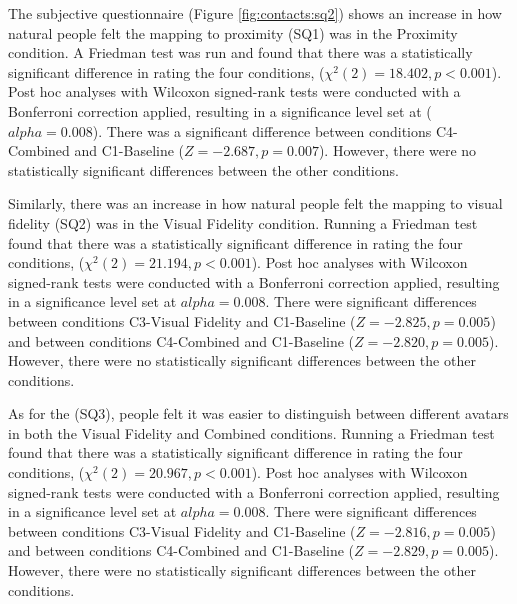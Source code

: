 The subjective questionnaire (Figure \ref{fig:contacts:sq2}) shows an increase in how natural people felt the mapping to proximity (SQ1) was in the Proximity condition. A Friedman test was run and found that there was a statistically significant difference in rating the four conditions, ($\chi^2(2)=18.402,p<0.001$). Post hoc analyses with Wilcoxon signed-rank tests were conducted with a Bonferroni correction applied, resulting in a significance level set at ($alpha=0.008$). There was a significant difference between conditions C4-Combined and C1-Baseline ($Z=-2.687, p=0.007$). However, there were no statistically significant differences between the other conditions.

Similarly, there was an increase in how natural people felt the mapping to visual fidelity (SQ2) was in the Visual Fidelity condition. Running a Friedman test found that there was a statistically significant difference in rating the four conditions, ($\chi^2(2)=21.194,p<0.001$). Post hoc analyses with Wilcoxon signed-rank tests were conducted with a Bonferroni correction applied, resulting in a significance level set at $alpha=0.008$. There were significant differences between conditions C3-Visual Fidelity and C1-Baseline ($Z=-2.825, p=0.005$) and between conditions C4-Combined and C1-Baseline ($Z=-2.820, p=0.005$). However, there were no statistically significant differences between the other conditions.

As for the (SQ3), people felt it was easier to distinguish between different avatars in both the Visual Fidelity and Combined conditions. Running a Friedman test found that there was a statistically significant difference in rating the four conditions, ($\chi^2(2)=20.967,p<0.001$). Post hoc analyses with Wilcoxon signed-rank tests were conducted with a Bonferroni correction applied, resulting in a significance level set at $alpha=0.008$. There were significant differences between conditions C3-Visual Fidelity and C1-Baseline ($Z=-2.816, p=0.005$) and between conditions C4-Combined and C1-Baseline ($Z=-2.829, p=0.005$). However, there were no statistically significant differences between the other conditions.


